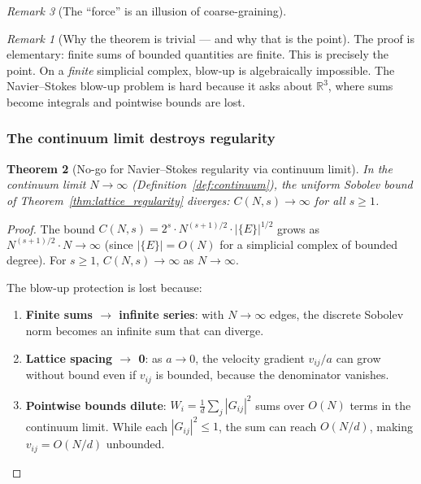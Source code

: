 \documentclass[12pt]{article}
\newtheorem{theorem}{Theorem}[section]
\theoremstyle{remark}
\newtheorem{remark}[theorem]{Remark}
\theoremstyle{definition}
\newcommand{\RR}{\mathbb{R}}
\begin{document}
\begin{remark}[The ``force'' is an illusion of coarse-graining]
\begin{remark}[Why the theorem is trivial --- and why that is the point]
The proof is elementary: finite sums of bounded quantities are finite.
This is precisely the point.  On a \emph{finite} simplicial complex,
blow-up is algebraically impossible.  The Navier--Stokes blow-up
problem is hard because it asks about $\RR^3$, where sums become
integrals and pointwise bounds are lost.
\end{remark}

\subsubsection{The continuum limit destroys regularity}

\begin{theorem}[No-go for Navier--Stokes regularity via continuum limit]
\label{thm:ns_nogo}
In the continuum limit $N \to \infty$ (Definition~\ref{def:continuum}),
the uniform Sobolev bound of Theorem~\ref{thm:lattice_regularity}
diverges: $C(N, s) \to \infty$ for all $s \geq 1$.
\end{theorem}

\begin{proof}
The bound $C(N, s) = 2^s \cdot N^{(s+1)/2} \cdot |\{E\}|^{1/2}$
grows as $N^{(s+1)/2} \cdot N \to \infty$ (since
$|\{E\}| = O(N)$ for a simplicial complex of bounded degree).
For $s \geq 1$, $C(N,s) \to \infty$ as $N \to \infty$.

The blow-up protection is lost because:
\begin{enumerate}
\item \textbf{Finite sums $\to$ infinite series}: with $N \to \infty$
  edges, the discrete Sobolev norm becomes an infinite sum that
  can diverge.
\item \textbf{Lattice spacing $\to$ 0}: as $a \to 0$, the velocity
  gradient $v_{ij}/a$ can grow without bound even if $v_{ij}$ is
  bounded, because the denominator vanishes.
\item \textbf{Pointwise bounds dilute}: $W_i = \frac{1}{d}\sum_j
  |G_{ij}|^2$ sums over $O(N)$ terms in the continuum limit.
  While each $|G_{ij}|^2 \leq 1$, the sum can reach $O(N/d)$,
  making $v_{ij} = O(N/d)$ unbounded.
\end{enumerate}
\end{proof}


\end{remark}
\end{document}
